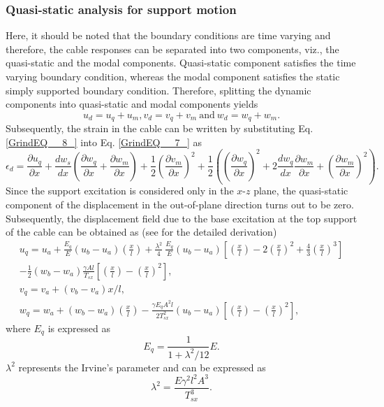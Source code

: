 \documentclass[review]{elsarticle}
\begin{document}
\subsubsection{Quasi-static analysis for support motion}
Here, it should be noted that the boundary conditions are time varying and therefore, the cable responses can be separated into two components, viz., the quasi-static and the modal components. Quasi-static component satisfies the time varying boundary condition, whereas the modal component satisfies the static simply supported boundary condition.  Therefore, splitting the dynamic components into quasi-static and modal components yields
\begin{equation} \label{GrindEQ__8_} 
u_d=u_q+u_m, v_d=v_q+v_m ~\mbox{and}~ w_d=w_q+w_m.        
\end{equation} 
Subsequently, the strain in the cable can be written by substituting Eq. \eqref{GrindEQ__8_} into Eq. \eqref{GrindEQ__7_} as
\begin{equation} \label{GrindEQ__9_} 
{\epsilon }_d=\frac{\partial u_q}{\partial x}+\frac{dw_s}{dx}\left(\frac{\partial w_q}{\partial x}+\frac{\partial w_m}{\partial x}\right)+\frac{1}{2}{\left(\frac{\partial v_m}{\partial x}\right)}^2+\frac{1}{2}\left({\left(\frac{\partial w_q}{\partial x}\right)}^2+2\frac{dw_q}{dx}\frac{\partial w_m}{\partial x}+{\left(\frac{\partial w_m}{\partial x}\right)}^2\right).   
\end{equation} 
Since the support excitation is considered only in the $x$-$z$ plane, the quasi-static component of the displacement in the out-of-plane direction turns out to be zero.  Subsequently, the displacement field due to the base excitation at the top support of the cable can be obtained as (see \cite{Wagg_2009,Warnitchai_1995} for the detailed derivation)
\begin{equation} \label{GrindEQ__10_} 
\begin{split}
u_q=u_a+\frac{E_q}{E}\left(u_b-u_a\right)\left(\frac{x}{l}\right)+\frac{{\lambda }^2}{4}\ \frac{E_q}{E}\left(u_b-u_a\right)\left[\left(\frac{x}{l}\right)-2{\left(\frac{x}{l}\right)}^2+\frac{4}{3}{\left(\frac{x}{l}\right)}^3\right]\\-\frac{1}{2}(w_b-w_a)\frac{\gamma Al}{T_{sx}}\left[\left(\frac{x}{l}\right)-{\left(\frac{x}{l}\right)}^2\right],\\
v_q=v_a+\left(v_b-v_a\right)x/l,\\
w_q=w_a+\left(w_b-w_a\right)\left(\frac{x}{l}\right)- \frac{\gamma E_qA^2l}{{2T}^2_{sx}}\left(u_b-u_a\right)\left[\left(\frac{x}{l}\right)-{\left(\frac{x}{l}\right)}^2\right],
\end{split}
\end{equation} 
where $E_q$ is expressed as
\begin{equation} \label{GrindEQ__11_} 
E_q=\frac{1}{1+{\lambda }^2/12}E.             
\end{equation} 
${\lambda }^2$ represents the Irvine's parameter and can be expressed as
\begin{equation} \label{GrindEQ__12_} 
{\lambda }^2=\frac{E{\gamma }^2l^2A^3}{T^3_{sx}}.             
\end{equation} 
\end{document}
